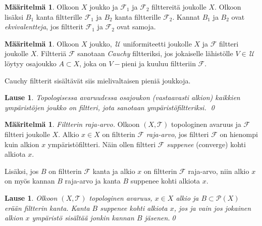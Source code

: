 \documentclass[12pt,a4paper,leqno]{report}
\newcommand{\U}{\,\mathcal{U}}
\newcommand{\T}{\mathcal{T}}
\newcommand{\Pot}{\mathcal{P}}
\newcommand{\F}{\mathcal{F}}
\theoremstyle{plain}
\newtheorem{lause}[equation]{Lause}
\theoremstyle{definition}
\newtheorem{maar}[equation]{Määritelmä}
\theoremstyle{remark}
\begin{document}
\begin{maar}
Olkoon $X$ joukko ja $\F_1$ ja $\F_2$ filttereitä joukolle $X$. 
Olkoon lisäksi $B_1$ kanta filtterille $\F_1$ ja $B_2$ kanta filtterille $\F_2$. 
Kannat $B_1$ ja $B_2$ ovat \emph{ekvivalentteja}, 
jos filtterit $\F_1$ ja $\F_2$ ovat samoja.
\end{maar}
\begin{maar}\label{Cauchy_filtteri}
Olkoon $X$ joukko, $\U$ uniformiteetti joukolle $X$ ja $\F$ filtteri joukolle $X$. 
Filtteriä $\F$ sanotaan \emph{Cauchy} filtteriksi, 
jos jokaiselle lähistölle $V\in\U$ löytyy osajoukko $A\subset X$, 
joka on $V-$pieni ja kuuluu filtteriin $\F$. %
\end{maar}
\noindent Cauchy filtterit sisältävät siis mielivaltaisen pieniä joukkoja. 
\begin{lause}
Topologisessa avaruudessa osajoukon (vastaavasti alkion) kaikkien ympäristöjen joukko on filtteri, jota sanotaan ympäristöfiltteriksi.
\qed
\end{lause}
\begin{maar}
\emph{Filtterin raja-arvo.} 
Olkoon $(X,\T)$ topologinen avaruus ja $\F$ filtteri joukolle $X$. 
Alkio $x\in X$ on filtterin $\F$ \emph{raja-arvo}, 
jos filtteri $\F$ on hienompi kuin 
alkion $x$ ympäristöfiltteri. %
Näin ollen filtteri $\F$ \emph{suppenee} (converge) kohti alkiota $x$. 

Lisäksi, jos $B$ on filtterin $\F$ kanta 
ja alkio $x$ on filtterin $\F$ raja-arvo, 
niin alkio $x$ on myös kannan $B$ raja-arvo ja 
kanta $B$ suppenee kohti alkiota $x$.
\end{maar}
\begin{lause}
Olkoon $(X,\T)$ topologinen avaruus, $x\in X$ alkio ja $B\subset\Pot(X)$ erään filtterin kanta. Kanta $B$ suppenee kohti alkiota $x$, jos ja vain jos 
jokainen alkion $x$ ympäristö sisältää jonkin kannan $B$ jäsenen.\qed
\end{lause}
\end{document}
